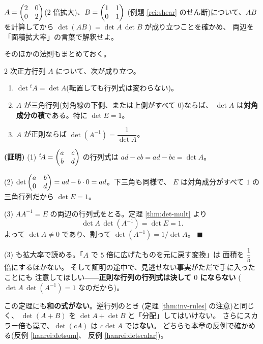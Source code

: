 \begin{mondai}\label{q:det-mult}
$A = \begin{pmatrix}2 & 0 \\ 0 & 2\end{pmatrix}$($2$ 倍拡大)、$B = \begin{pmatrix}1 & 1 \\ 0 & 1\end{pmatrix}$
(例題 \ref{rei:shear} のせん断)について、$AB$ を計算してから
$\det(AB) = \det A \, \det B$ が成り立つことを確かめ、
両辺を「面積拡大率」の言葉で解釈せよ。
\end{mondai}

そのほかの法則もまとめておく。

\begin{teiri}[行列式の計算法則]\label{thm:det-rules}
$2$ 次正方行列 $A$ について、次が成り立つ。
\begin{enumerate}
\item $\det {}^t\!A = \det A$(転置しても行列式は変わらない)。
\item $A$ が三角行列(対角線の下側、または上側がすべて $0$)ならば、
$\det A$ は\textbf{対角成分の積}である。特に $\det E = 1$。
\item $A$ が正則ならば $\det(A^{-1}) = \dfrac{1}{\det A}$。
\end{enumerate}
\end{teiri}

\noindent\textbf{(証明)}\quad
(1) ${}^t\!A = \begin{pmatrix}a & c \\ b & d\end{pmatrix}$ の行列式は $ad - cb = ad - bc = \det A$。

(2) $\det \begin{pmatrix}a & b \\ 0 & d\end{pmatrix} = ad - b \cdot 0 = ad$。下三角も同様で、
$E$ は対角成分がすべて $1$ の三角行列だから $\det E = 1$。

(3) $AA^{-1} = E$ の両辺の行列式をとる。定理 \ref{thm:det-mult} より
\[
\det A \, \det(A^{-1}) = \det E = 1.
\]
よって $\det A \neq 0$ であり、割って $\det(A^{-1}) = 1/\det A$。 $\blacksquare$

(3) も拡大率で読める。「$A$ で $5$ 倍に広げたものを元に戻す変換」は
面積を $\dfrac{1}{5}$ 倍にするほかない。
そして証明の途中で、見逃せない事実がただで手に入ったことにも
注意してほしい――\textbf{正則な行列の行列式は決して $0$ にならない}
($\det A \, \det(A^{-1}) = 1$ なのだから)。

\begin{chui}
この定理にも\textbf{和の式がない}。逆行列のとき
(定理 \ref{thm:inv-rules} の注意)と同じく、
$\det(A + B)$ を $\det A + \det B$ と「分配」してはいけない。
さらにスカラー倍も罠で、$\det(cA)$ は $c \det A$ では\textbf{ない}。
どちらも本章の反例で確かめる(反例 \ref{hanrei:detsum}、
反例 \ref{hanrei:detscalar})。
\end{chui}


